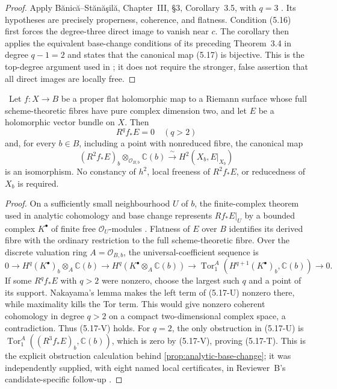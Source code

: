 \begin{proof}
Apply B\u{a}nic\u{a}--St\u{a}n\u{a}\c{s}il\u{a},
Chapter~III, \S3, Corollary~3.5, with $q=3$
\cite[pp.~120--121]{BanicaStanasila1976}.  Its hypotheses are precisely
properness, coherence, and flatness.  Condition (5.16) first forces the
degree-three direct image to vanish near $c$.  The corollary then applies the
equivalent base-change conditions of its preceding Theorem~3.4 in degree
$q-1=2$ and states that the canonical map (5.17) is bijective.  This is the
top-degree argument used in \cite[Lemma~1.5]{CDP1998}; it does not require
the stronger, false assertion that all direct images are locally free.
\end{proof}

\begin{corollary}
\label{cor:surface-top-base-change}
\Verified\ Let $f:X\to B$ be a proper flat holomorphic map to a Riemann
surface whose full scheme-theoretic fibres have pure complex dimension two,
and let $E$ be a holomorphic vector bundle on $X$.  Then
\[
 R^qf_*E=0\quad(q>2)
 \tag{5.17-V}
\]
and, for every $b\in B$, including a point with nonreduced fibre, the
canonical map
\[
 (R^2f_*E)_b\otimes_{\mathcal O_{B,b}}\mathbb C(b)
 \xrightarrow{\ \sim\ }H^2(X_b,E|_{X_b})
 \tag{5.17-T}
\]
is an isomorphism.  No constancy of $h^2$, local freeness of $R^2f_*E$, or
reducedness of $X_b$ is required.
\end{corollary}

\begin{proof}
On a sufficiently small neighbourhood $U$ of $b$, the finite-complex theorem
used in analytic cohomology and base change represents $Rf_*E|_U$ by a
bounded complex $K^\bullet$ of finite free $\mathcal O_U$-modules
\cite[Chapter~III, \S3, Theorem~3.4]{BanicaStanasila1976}.  Flatness of
$E$ over $B$ identifies its derived fibre with the ordinary restriction to
the full scheme-theoretic fibre.  Over the discrete valuation ring
$A=\mathcal O_{B,b}$, the universal-coefficient sequence is
\[
0\longrightarrow H^q(K^\bullet)_b\otimes_A\mathbb C(b)
 \longrightarrow H^q(K^\bullet\otimes_A\mathbb C(b))
 \longrightarrow
 \operatorname{Tor}_1^A(H^{q+1}(K^\bullet)_b,\mathbb C(b))
 \longrightarrow0.
\tag{5.17-U}
\]
If some $R^qf_*E$ with $q>2$ were nonzero, choose the largest such $q$ and a
point of its support.  Nakayama's lemma makes the left term of (5.17-U)
nonzero there, while maximality kills the Tor term.  This would give nonzero
coherent cohomology in degree $q>2$ on a compact two-dimensional complex
space, a contradiction.  Thus (5.17-V) holds.  For $q=2$, the only
obstruction in (5.17-U) is
$\operatorname{Tor}_1^A((R^3f_*E)_b,\mathbb C(b))$, which is zero by
(5.17-V), proving (5.17-T).  This is the explicit obstruction calculation
behind \cref{prop:analytic-base-change}; it was independently supplied, with
eight named local certificates, in Reviewer~B's candidate-specific follow-up
\cite{ReviewerBValidation2026}.
\end{proof}

